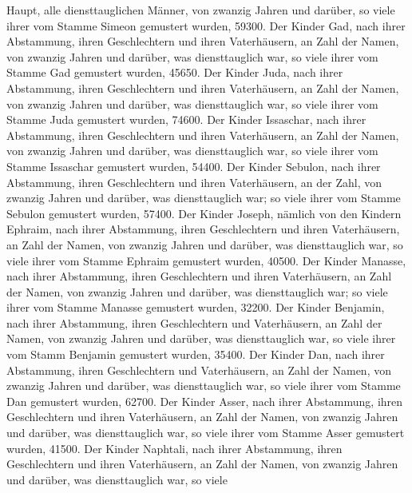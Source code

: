 Haupt, alle diensttauglichen Männer, von zwanzig Jahren und darüber,
 so viele ihrer vom Stamme Simeon gemustert wurden,
59300.  Der Kinder Gad, nach ihrer Abstammung, ihren
Geschlechtern und ihren Vaterhäusern, an Zahl der Namen, von zwanzig
Jahren und darüber, was diensttauglich war,  so viele
ihrer vom Stamme Gad gemustert wurden, 45650.  Der Kinder
Juda, nach ihrer Abstammung, ihren Geschlechtern und ihren Vaterhäusern,
an Zahl der Namen, von zwanzig Jahren und darüber, was diensttauglich
war,  so viele ihrer vom Stamme Juda gemustert wurden,
74600.  Der Kinder Issaschar, nach ihrer Abstammung,
ihren Geschlechtern und ihren Vaterhäusern, an Zahl der Namen, von
zwanzig Jahren und darüber, was diensttauglich war,  so
viele ihrer vom Stamme Issaschar gemustert wurden, 54400.
 Der Kinder Sebulon, nach ihrer Abstammung, ihren
Geschlechtern und ihren Vaterhäusern, an der Zahl, von zwanzig Jahren
und darüber, was diensttauglich war;  so viele ihrer vom
Stamme Sebulon gemustert wurden, 57400.  Der Kinder
Joseph, nämlich von den Kindern Ephraim, nach ihrer Abstammung, ihren
Geschlechtern und ihren Vaterhäusern, an Zahl der Namen, von zwanzig
Jahren und darüber, was diensttauglich war,  so viele
ihrer vom Stamme Ephraim gemustert wurden, 40500.  Der
Kinder Manasse, nach ihrer Abstammung, ihren Geschlechtern und ihren
Vaterhäusern, an Zahl der Namen, von zwanzig Jahren und darüber, was
diensttauglich war;  so viele ihrer vom Stamme Manasse
gemustert wurden, 32200.  Der Kinder Benjamin, nach ihrer
Abstammung, ihren Geschlechtern und Vaterhäusern, an Zahl der Namen, von
zwanzig Jahren und darüber, was diensttauglich war,  so
viele ihrer vom Stamm Benjamin gemustert wurden, 35400. 
Der Kinder Dan, nach ihrer Abstammung, ihren Geschlechtern und
Vaterhäusern, an Zahl der Namen, von zwanzig Jahren und darüber, was
diensttauglich war,  so viele ihrer vom Stamme Dan
gemustert wurden, 62700.  Der Kinder Asser, nach ihrer
Abstammung, ihren Geschlechtern und ihren Vaterhäusern, an Zahl der
Namen, von zwanzig Jahren und darüber, was diensttauglich war,
 so viele ihrer vom Stamme Asser gemustert wurden, 41500.
 Der Kinder Naphtali, nach ihrer Abstammung, ihren
Geschlechtern und ihren Vaterhäusern, an Zahl der Namen, von zwanzig
Jahren und darüber, was diensttauglich war,  so viele
